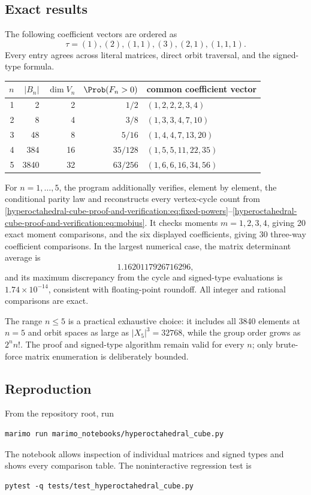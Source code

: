 \documentclass[10pt]{article}
\begin{document}
\subsection{Exact results}
The following coefficient vectors are ordered as
\[
\tau=(1),(2),(1,1),(3),(2,1),(1,1,1).
\]
Every entry agrees across literal matrices, direct orbit traversal, and the
signed-type formula.
\begin{center}
\begin{tabular}{@{}rrrrl@{}}
\toprule
$n$ & $|B_n|$ & $\dim V_n$ & $\Prob(F_n>0)$ & common coefficient vector\\
\midrule
1 & 2    & 2  & $1/2$   & $(1,2,2,2,3,4)$\\
2 & 8    & 4  & $3/8$   & $(1,3,3,4,7,10)$\\
3 & 48   & 8  & $5/16$  & $(1,4,4,7,13,20)$\\
4 & 384  & 16 & $35/128$& $(1,5,5,11,22,35)$\\
5 & 3840 & 32 & $63/256$& $(1,6,6,16,34,56)$\\
\bottomrule
\end{tabular}
\end{center}

For $n=1,\ldots,5$, the program additionally verifies, element by element,
the conditional parity law and reconstructs every vertex-cycle count from
\eqref{hyperoctahedral-cube-proof-and-verification:eq:fixed-powers}--\eqref{hyperoctahedral-cube-proof-and-verification:eq:mobius}.  It checks moments $m=1,2,3,4$,
giving 20 exact moment comparisons, and the six displayed coefficients,
giving 30 three-way coefficient comparisons.  In the largest numerical case,
the matrix determinant average is
\[
1.1620117926716296,
\]
and its maximum discrepancy from the cycle and signed-type evaluations is
$1.74\times10^{-14}$, consistent with floating-point roundoff.  All integer
and rational comparisons are exact.

The range $n\leq5$ is a practical exhaustive choice: it includes all 3840
elements at $n=5$ and orbit spaces as large as $|X_5|^3=32768$, while the
group order grows as $2^n n!$.  The proof and signed-type algorithm remain
valid for every $n$; only brute-force matrix enumeration is deliberately
bounded.

\subsection{Reproduction}
From the repository root, run
\begin{verbatim}
marimo run marimo_notebooks/hyperoctahedral_cube.py
\end{verbatim}
The notebook allows inspection of individual matrices and signed types and
shows every comparison table.  The noninteractive regression test is
\begin{verbatim}
pytest -q tests/test_hyperoctahedral_cube.py
\end{verbatim}
\end{document}
